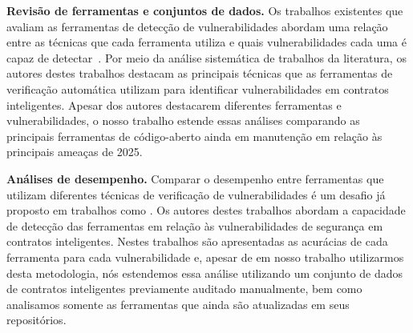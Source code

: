 \documentclass[12pt]{article}
\begin{document}
\textbf{Revisão de ferramentas e conjuntos de dados.} Os trabalhos existentes que avaliam as ferramentas de detecção de vulnerabilidades abordam uma relação entre as técnicas que cada ferramenta utiliza e quais vulnerabilidades cada uma é capaz de detectar~\cite{rameder2022review, zhou2022state, khan2024survey}. Por meio da análise sistemática de trabalhos da literatura, os autores destes trabalhos destacam as principais técnicas que as ferramentas de verificação automática utilizam para identificar vulnerabilidades em contratos inteligentes. Apesar dos autores destacarem diferentes ferramentas e vulnerabilidades, o nosso trabalho estende essas análises comparando as principais ferramentas de código-aberto ainda em manutenção em relação às principais ameaças de 2025. 

\textbf{Análises de desempenho.} Comparar o desempenho entre ferramentas que utilizam diferentes técnicas de verificação de vulnerabilidades é um desafio já proposto em trabalhos como \cite{parizi2018empirical, durieux2020empirical, kushwaha2022ethereum}. Os autores destes trabalhos abordam a capacidade de detecção das ferramentas em relação às vulnerabilidades de segurança em contratos inteligentes. Nestes trabalhos são apresentadas as acurácias de cada ferramenta para cada vulnerabilidade e, apesar de em nosso trabalho utilizarmos desta metodologia, nós estendemos essa análise utilizando um conjunto de dados de contratos inteligentes previamente auditado manualmente, bem como analisamos somente as ferramentas que ainda são atualizadas em seus repositórios.
\end{document}
